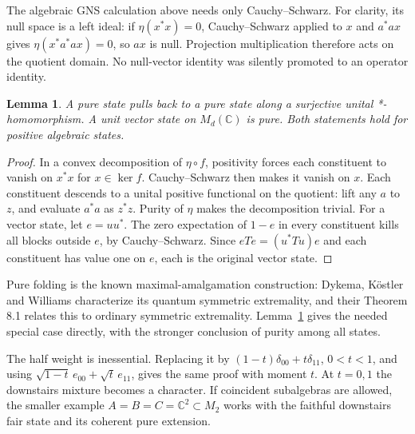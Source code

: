 \documentclass[10pt]{article}
\newtheorem{lemma}[theorem]{Lemma}
\newcommand{\C}{\mathbb C}
\begin{document}
The algebraic GNS calculation above needs only Cauchy--Schwarz.
For clarity, its null space is a left ideal: if \(\eta(x^*x)=0\),
Cauchy--Schwarz applied to \(x\) and \(a^*ax\) gives
\(\eta(x^*a^*ax)=0\), so \(ax\) is null. Projection multiplication
therefore acts on the quotient domain. No null-vector identity was
silently promoted to an operator identity.

\begin{lemma}\label{pure}
A pure state pulls back to a pure state along a surjective unital
*-homomorphism. A unit vector state on \(M_d(\C)\) is pure.
Both statements hold for positive algebraic states.
\end{lemma}
\begin{proof}
In a convex decomposition of \(\eta\circ f\), positivity forces each
constituent to vanish on \(x^*x\) for \(x\in\ker f\).
Cauchy--Schwarz then makes it vanish on \(x\). Each constituent
descends to a unital positive functional on the quotient: lift
any \(a\) to \(z\), and evaluate \(a^*a\) as \(z^*z\).
Purity of \(\eta\) makes the decomposition trivial.
For a vector state, let \(e=uu^*\). The zero expectation of \(1-e\)
in every constituent kills all blocks outside \(e\), by
Cauchy--Schwarz. Since \(eTe=(u^*Tu)e\) and each constituent
has value one on \(e\), each is the original vector state.
\end{proof}

Pure folding is the known maximal-amalgamation construction:
Dykema, K\"ostler and Williams \cite[Proposition 8.7]{DKW} characterize
its quantum symmetric extremality, and their Theorem 8.1 relates
this to ordinary symmetric extremality. Lemma~\ref{pure} gives the
needed special case directly, with the stronger conclusion of purity
among all states.

The half weight is inessential. Replacing it by
\((1-t)\delta_{00}+t\delta_{11}\), \(0<t<1\), and using
\(\sqrt{1-t}\,e_{00}+\sqrt t\,e_{11}\), gives the same proof with
moment \(t\). At \(t=0,1\) the downstairs mixture becomes a character.
If coincident subalgebras are allowed, the smaller example
\(A=B=C=\C^2\subset M_2\) works with the faithful downstairs fair
state and its coherent pure extension.
\end{document}
